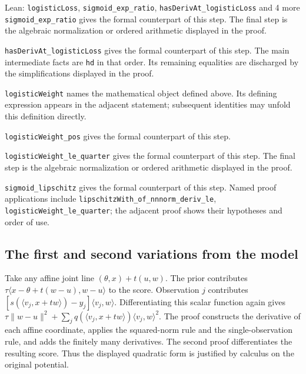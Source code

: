 \documentclass[11pt,a4paper]{report}
\begin{document}
\begin{leanbox}{Lean: \texttt{logisticLoss}, \texttt{sigmoid\_\allowbreak{}exp\_\allowbreak{}ratio}, \texttt{hasDerivAt\_\allowbreak{}logisticLoss} and 4 more}
\texttt{sigmoid\_\allowbreak{}exp\_\allowbreak{}ratio} gives the formal counterpart of this step. The final step is the algebraic normalization or ordered arithmetic displayed in the proof.




\texttt{has\allowbreak{}Deriv\allowbreak{}At\_\allowbreak{}logistic\allowbreak{}Loss} gives the formal counterpart of this step. The main intermediate facts are \texttt{hd} in that order. Its remaining equalities are discharged by the simplifications displayed in the proof.




\texttt{logistic\allowbreak{}Weight} names the mathematical object defined above. Its defining expression appears in the adjacent statement; subsequent identities may unfold this definition directly.




\texttt{logistic\allowbreak{}Weight\_\allowbreak{}pos} gives the formal counterpart of this step.




\texttt{logistic\allowbreak{}Weight\_\allowbreak{}le\_\allowbreak{}quarter} gives the formal counterpart of this step. The final step is the algebraic normalization or ordered arithmetic displayed in the proof.




\texttt{sigmoid\_\allowbreak{}lipschitz} gives the formal counterpart of this step. Named proof applications include \texttt{lipschitz\allowbreak{}With\_\allowbreak{}of\_\allowbreak{}nnnorm\_\allowbreak{}deriv\_\allowbreak{}le}, \texttt{logistic\allowbreak{}Weight\_\allowbreak{}le\_\allowbreak{}quarter}; the adjacent proof shows their hypotheses and order of use.
\end{leanbox}
\subsection{\texorpdfstring{The first and second variations from the model}{The first and second variations from the model}}
\label{report-step-KIPLMC-LogisticExample-lean-2}


Take any affine joint line \((\theta,x)+t(u,w)\). The prior contributes \(\tau\langle x-\theta+t(w-u),w-u\rangle\) to the score. Observation \(j\) contributes \([s(\langle v_j,x+tw\rangle)-y_j]\langle v_j,w\rangle\). Differentiating this scalar function again gives \(\tau\|w-u\|^2+\sum_jq(\langle v_j,x+tw\rangle)\langle v_j,w\rangle^2\). The proof constructs the derivative of each affine coordinate, applies the squared-norm rule and the single-observation rule, and adds the finitely many derivatives. The second proof differentiates the resulting score. Thus the displayed quadratic form is justified by calculus on the original potential.
\end{document}
